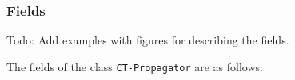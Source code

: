 \documentclass[a4paper,11pt]{article}
\newcommand{\Todo}[1]{{\color{blue}Todo: #1}}
\newcommand{\SparseBitSet}{\texttt{SparseBitSet}}
\numberwithin{equation}{section}
\begin{document}



\subsubsection{Fields}
\label{CT:fields}

\Todo{Add examples with figures for describing the fields.}

The fields of the class \texttt{CT-Propagator} are as follows:
\end{document}
